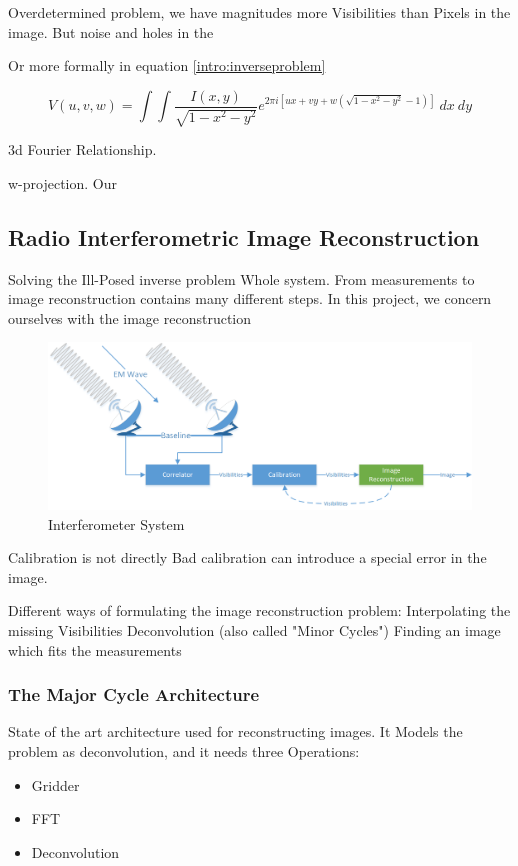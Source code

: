 Overdetermined problem, we have magnitudes more Visibilities than Pixels in the image. But noise and holes in the 


Or more formally in equation \eqref{intro:inverseproblem}


\begin{equation}\label{intro:inverseproblem}
V(u, v, w) = \int\int \frac{I(x, y)}{\sqrt{1 - x^2 - y ^2}} e^{2 \pi i [ux+vy+ w(\sqrt{1 - x^2 - y ^2} - 1)]} \: dx \: dy
\end{equation}

3d Fourier Relationship.

w-projection.
Our


\subsection{Radio Interferometric Image Reconstruction}

Solving the Ill-Posed inverse problem
Whole system.
From measurements to image reconstruction contains many different steps. In this project, we concern ourselves with the image reconstruction

\begin{figure}[h]
	\centering
	\includegraphics[width=0.80\linewidth]{./chapters/01.intro/system.png}
	\caption{Interferometer System}
	\label{intro:system}
\end{figure}

Calibration is not directly
Bad calibration can introduce a special error in the image.

Different ways of formulating the image reconstruction problem:
Interpolating the missing Visibilities
Deconvolution (also called "Minor Cycles")
Finding an image which fits the measurements

\subsubsection{The Major Cycle Architecture}
State of the art architecture used for reconstructing images. It Models the problem as deconvolution, and it needs three Operations:
\begin{itemize}
	\item Gridder
	\item FFT
	\item Deconvolution
\end{itemize}

